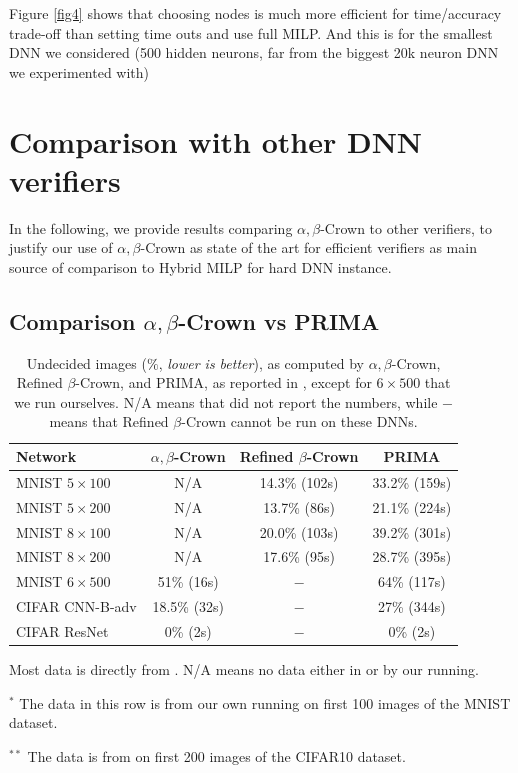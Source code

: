 Figure \ref{fig4} shows that choosing nodes is much more efficient for time/accuracy trade-off than setting time outs and use full MILP. And this is for the smallest DNN we considered (500 hidden neurons, far from the biggest 20k neuron DNN we experimented with)


\section{Comparison with other DNN verifiers}

In the following, we provide results comparing $\alpha,\beta$-Crown to other verifiers, to justify our use of $\alpha,\beta$-Crown as state of the art for efficient verifiers as main source of comparison to Hybrid MILP for hard DNN instance.


\subsection*{Comparison $\alpha,\beta$-Crown vs PRIMA}


\begin{table}[b!]
	\centering
	\begin{tabular}{||l||c|c||c||}
		\hline \hline
		Network & $\alpha,\beta$-Crown & Refined $\beta$-Crown & PRIMA \\ 		  
		\hline
		MNIST $5 \times 100$ & N/A  & 14.3\% (102s) & 33.2\% (159s)\\ \hline
		MNIST $5 \times 200$ & N/A & 13.7\% (86s) & 21.1\% (224s) \\ \hline
		MNIST $8 \times 100$ & N/A  & 20.0\% (103s) & 39.2\% (301s)   \\ \hline
		MNIST $8 \times 200$ & N/A & 17.6\% (95s) & 28.7\% (395s)  \\ \hline
		MNIST $6 \times 500$ & 51\% (16s) & $-$ & 64\% (117s) \\ \hline
		CIFAR CNN-B-adv & 18.5\% (32s) & $-$ & 27\% (344s)\\ \hline \hline
		CIFAR ResNet & 0\% (2s) & $-$ & 0\% (2s) \\ \hline \hline
	\end{tabular}
	\caption{Undecided images ($\%$, {\em lower is better}), as computed by $\alpha,\beta$-Crown, Refined $\beta$-Crown, and PRIMA, as reported in \cite{crown}, except for $6 \times 500$ that we run ourselves. N/A means that \cite{crown} did not report the numbers, while $-$ means that Refined $\beta$-Crown cannot be run on these DNNs.}
	\label{table9}
	\begin{tablenotes}
		\footnotesize
		\item Most data is directly from \cite{crown}. N/A means no data either in \cite{crown} or by our running.
		\item  $^*$ The data in this row is from our own running on first 100 images of the MNIST dataset.
		\item  $^{**}$ The data is from \cite{crown} on first 200 images of the CIFAR10 dataset.
	\end{tablenotes}
	\end{table}



